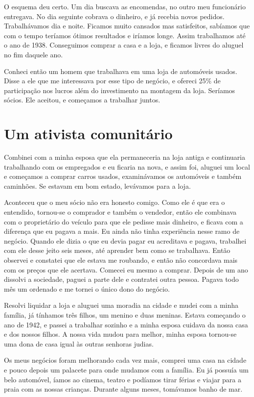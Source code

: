 O esquema deu certo. Um dia buscava as encomendas, no outro meu
funcionário entregava. No dia seguinte cobrava o dinheiro, e já
recebia novos pedidos. Trabalhávamos dia e noite. Ficamos muito
cansados mas satisfeitos, sabíamos que com o tempo teríamos ótimos
resultados e iríamos longe. Assim trabalhamos até o ano de 1938. Conseguimos 
comprar a casa e a loja, e ficamos livres do aluguel no fim
daquele ano. 

Conheci então um homem que trabalhava em uma
loja de automóveis usados. Disse a ele que me interessava por
esse tipo de negócio, e ofereci 25\% de participação nos lucros além do
investimento na montagem da loja. Seríamos sócios. Ele aceitou, e
começamos a trabalhar juntos.

\chapter{Um ativista comunitário}

Combinei com a minha esposa que ela permaneceria na loja antiga e
continuaria trabalhando com os empregados e eu ficaria na nova, e assim
foi, aluguei um local e começamos a comprar carros usados, examinávamos
os automóveis e também caminhões. Se estavam em bom estado, levávamos
para a loja.

Aconteceu que o meu sócio não era honesto comigo. Como ele é que era o
entendido, tornou-se o comprador e também o vendedor, então ele
combinava com o proprietário do veículo para que ele pedisse mais
dinheiro, e ficava com a diferença que eu pagava a mais. Eu ainda não
tinha experiência nesse ramo de negócio. Quando ele dizia o que eu devia
pagar eu acreditava e pagava, trabalhei com ele desse jeito seis meses,
até aprender bem como se trabalhava. Então observei e constatei que ele
estava me roubando, e então não concordava mais com os preços que ele
acertava. Comecei eu mesmo a comprar. Depois de um ano dissolvi a
sociedade, paguei a parte dele e contratei outra pessoa. Pagava todo mês
um ordenado e me tornei o único dono do negócio.

Resolvi liquidar a loja e aluguei uma moradia na cidade e mudei com a
minha família, já tínhamos três filhos, um menino e duas meninas. Estava
começando o ano de 1942, e passei a trabalhar sozinho e a minha esposa
cuidava da nossa casa e dos nossos filhos. A nossa vida mudou para
melhor, minha esposa tornou-se uma dona de casa igual às outras senhoras
judias.

Os meus negócios foram melhorando cada vez mais, comprei uma casa na
cidade e pouco depois um palacete para onde mudamos com a família. Eu já
possuía um belo automóvel, íamos ao cinema, teatro e podíamos tirar
férias e viajar para a praia com as nossas crianças. Durante alguns
meses, tomávamos banho de mar.

